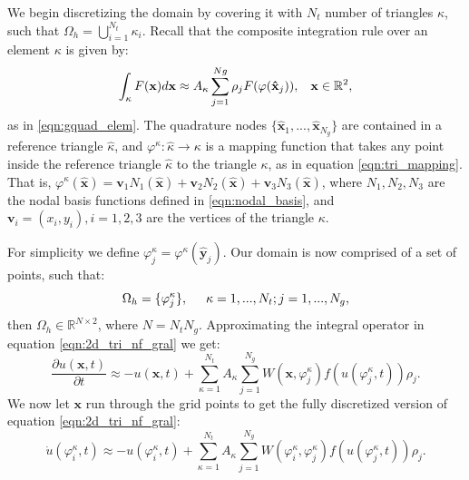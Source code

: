 \documentclass{uonmathreport}
\begin{document}
We begin discretizing the domain by covering it with $N_t$ number of triangles $\kappa$, such that $\Omega_h = \bigcup_{i=1}^{N_t} \kappa_{i}$. Recall that the composite integration rule over an element $\kappa$ is given by:
\begin{equation}
\int_{\kappa} F(\mathbf{x}) d\mathbf{x} \approx A_{\kappa} \sum_{j=1}^{Ng} \rho_j F(\varphi(\mathbf{\hat{x}}_j)), \hspace{3mm} \mathbf{x} \in \mathbb{R}^2,
\end{equation} 
as in \ref{eqn:gquad_elem}. 
The quadrature nodes $\{\mathbf{\hat x}_1,...,\mathbf{\hat x}_{N_g}\}$ are contained in a reference triangle $\hat \kappa$, and $\varphi^{\kappa} : \hat{\kappa} \rightarrow \kappa$ is a mapping function that takes any point inside the reference triangle $\hat{\kappa}$ to the triangle $\kappa$, as in equation \ref{eqn:tri_mapping}. 
That is, $\varphi^{\kappa}(\mathbf{\hat{x}}) = \mathbf{v}_1N_1(\mathbf{\hat{x}}) + \mathbf{v}_2N_2(\mathbf{\hat{x}}) + \mathbf{v}_3N_3(\mathbf{\hat{x}})$, where $N_1, N_2, N_3$ are the nodal basis functions defined in \ref{eqn:nodal_basis}, and $\mathbf{v}_i = (x_i, y_i), i=1,2,3$ are the vertices of the triangle $\kappa$. 

For simplicity we define $\varphi^{\kappa}_j=\varphi^{\kappa}(\mathbf{\hat{y}}_j)$. Our domain is now comprised of a set of points, such that: 
\begin{equation}\label{eqn:space_int_ps}
\Omega_h = \{\varphi^{\kappa}_j\}, \hspace{5mm} \kappa = 1,...,N_t; j=1,...,N_g,
\end{equation}
then $\Omega_h \in \mathbb{R}^{N \times 2}$, where $N=N_tN_g$.
Approximating the integral operator in equation \ref{eqn:2d_tri_nf_gral} we get:
\begin{equation}\label{eqn:2d_nf_2}
\frac{\partial u(\mathbf{x},t)}{\partial t} \approx - u(\mathbf{x},t) + \sum_{\kappa=1}^{N_t} A_{\kappa}\sum_{j=1}^{N_g} W(\mathbf{x},\varphi^{\kappa}_j)f(u(\varphi^{\kappa}_j, t)) \rho_j.
\end{equation}
We now let $\mathbf{x}$ run through the grid points to get the fully discretized version of equation \ref{eqn:2d_tri_nf_gral}:
\begin{equation}\label{eqn:2d_nf_3}
\dot{u}(\varphi^{\kappa}_i,t) \approx - u(\varphi^{\kappa}_i,t) + \sum_{\kappa=1}^{N_t} A_{\kappa}\sum_{j=1}^{N_g} W(\varphi^{\kappa}_i,\varphi^{\kappa}_j)f(u(\varphi^{\kappa}_j, t)) \rho_j.
\end{equation}
\end{document}
